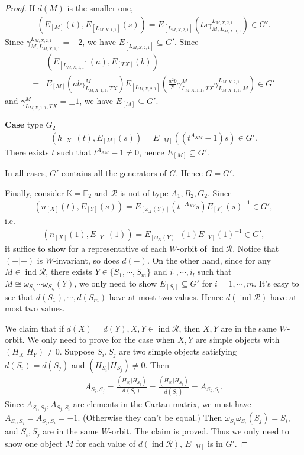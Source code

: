 \documentclass[10pt,a4paper]{amsart}
\begin{document}
\begin{proof}
   If $d(M)$ is the smaller one, 
   \begin{align*}
    (E_{[M]}(t),E_{[L_{M,X,1,1}]}(s)) = E_{[L_{M,X,2,1}]}(ts\gamma_{M,L_{M,X,1,1}}^{L_{M,X,2,1}} ) \in G'.
   \end{align*}
   Since $\gamma_{M,L_{M,X,1,1}}^{L_{M,X,2,1}} = \pm 2$, we have $E_{[L_{M,X,2,1}]}\subseteq  G'$.
   Since
   \begin{align*}
    &(E_{[L_{M,X,1,1}]}(a),E_{[TX]}(b)) \\
    =& E_{[M]}(ab\gamma_{L_{M,X,1,1},TX}^{M}) E_{[L_{M,X,2,1}]}(\frac{a^2b}{2!}\gamma_{L_{M,X,1,1},TX}^{M}\gamma_{L_{M,X,1,1},M}^{L_{M,X,2,1}} ) \in G'
   \end{align*}
   and $\gamma_{L_{M,X,1,1},TX}^{M} = \pm 1$, we have $E_{[M]}\subseteq  G'$.

   \textbf{Case} type $G_2$
   \begin{align*}
    (h_{[X]}(t),E_{[M]}(s)) = E_{[M]}((t^{A_{XM}}-1)s) \in G'.
   \end{align*}
   There exists $t$ such that $t^{A_{XM}}-1 \neq 0$, hence $E_{[M]}\subseteq  G'$.

   In all cases, $G'$ contains all the generators of $G$. Hence $G=G'$.

   Finally, consider $\mathbb{K}=\mathbb{F}_2$ and $\mathcal{R}$ is not of type $A_1,B_2,G_2$.
   Since
   \begin{align*}
    (n_{[X]}(t),E_{[Y]}(s)) = E_{[\omega_X(Y)]}(t^{-A_{XY}}s) E_{[Y]}(s)^{-1} \in G',
   \end{align*}
   i.e.
   \begin{align*}
    (n_{[X]}(1),E_{[Y]}(1)) = E_{[\omega_X(Y)]}(1) E_{[Y]}(1)^{-1} \in G',
   \end{align*}
   it suffice to show for a representative of each $W$-orbit of $\operatorname{ind}\mathcal{R}$.
   Notice that $(-|-)$ is $W$-invariant, so does $d(-)$. 
   On the other hand, since for any $M\in \operatorname{ind}\mathcal{R}$, there exists $Y\in \{ S_{1},\cdots,S_{m} \}$ and $i_1,\cdots,i_l$ such that $M\cong \omega_{S_{i_1}}\cdots\omega_{S_{i_l}}(Y)$,
   we only need to show $E_{[S_i]}\subseteq  G'$ for $i=1,\cdots,m$.
   It's easy to see that $d(S_1),\cdots,d(S_m)$ have at most two values.
   Hence $d(\operatorname{ind}\mathcal{R})$ have at most two values.

   We claim that if $d(X) = d(Y), X,Y\in \operatorname{ind}\mathcal{R}$, then $X,Y$ are in the same $W$-orbit.
   We only need to prove for the case when $X,Y$ are simple objects with $(H_X|H_Y)\neq 0$.
   Suppose $S_i,S_j$ are two simple objects satisfying $d(S_i)=d(S_j)$ and $(H_{S_i}|H_{S_j}) \neq 0$.
   Then 
   \begin{align*}
    A_{S_i,S_j} = \frac{(H_{S_i}|H_{S_j})}{d(S_i)} =  \frac{(H_{S_i}|H_{S_j})}{d(S_j)} = A_{S_j,S_i}.
   \end{align*}
   Since $A_{S_i,S_j},A_{S_j,S_i}$ are elements in the Cartan matrix, we must have $A_{S_i,S_j} = A_{S_j,S_i}=-1$.
   (Otherwise they can't be equal.)
   Then $\omega_{S_j}\omega_{S_i}(S_j)=S_i$, and $S_i,S_j$ are in the same $W$-orbit.
   The claim is proved.
   Thus we only need to show one object $M$ for each value of $d(\operatorname{ind}\mathcal{R})$, $E_{[M]}$ is in $G'$.


\end{proof}
\end{document}
